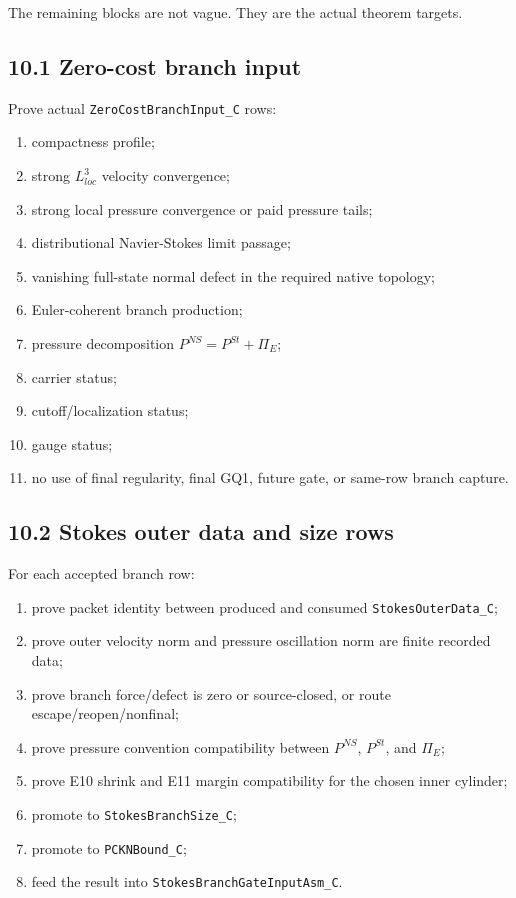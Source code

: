 \documentclass[11pt]{article}
\begin{document}
The remaining blocks are not vague. They are the actual theorem targets.

\subsection*{10.1 Zero-cost branch input}

Prove actual \texttt{ZeroCostBranchInput\_C} rows:

\begin{enumerate}
\item
  compactness profile;
\item
  strong \(L^3_{loc}\) velocity convergence;
\item
  strong local pressure convergence or paid pressure tails;
\item
  distributional Navier-Stokes limit passage;
\item
  vanishing full-state normal defect in the required native topology;
\item
  Euler-coherent branch production;
\item
  pressure decomposition \(P^{NS}=P^{St}+\Pi_E\);
\item
  carrier status;
\item
  cutoff/localization status;
\item
  gauge status;
\item
  no use of final regularity, final GQ1, future gate, or same-row branch capture.
\end{enumerate}

\subsection*{10.2 Stokes outer data and size rows}

For each accepted branch row:

\begin{enumerate}
\item
  prove packet identity between produced and consumed \texttt{StokesOuterData\_C};
\item
  prove outer velocity norm and pressure oscillation norm are finite recorded data;
\item
  prove branch force/defect is zero or source-closed, or route escape/reopen/nonfinal;
\item
  prove pressure convention compatibility between \(P^{NS}\), \(P^{St}\), and \(\Pi_E\);
\item
  prove E10 shrink and E11 margin compatibility for the chosen inner cylinder;
\item
  promote to \texttt{StokesBranchSize\_C};
\item
  promote to \texttt{PCKNBound\_C};
\item
  feed the result into \texttt{StokesBranchGateInputAsm\_C}.
\end{enumerate}
\end{document}
